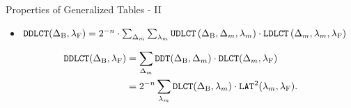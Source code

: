 \begin{frame}{Properties of Generalized \dlct Tables - II}
\begin{itemize}
\item $\texttt{DDLCT}(\Delta_{\textrm{B}}, \lambda_{\textrm{F}}) = 2^{-n}\cdot \sum_{\Delta_{m}}\sum_{\lambda_{m}}  \texttt{UDLCT}\left(\Delta_{\textrm{B}}, \Delta_{m}, \lambda_{m}\right) \cdot \texttt{LDLCT}\left(\Delta_{m}, \lambda_{m}, \lambda_{\textrm{F}}\right)$
\end{itemize}
\begin{align*}
\texttt{DDLCT}(\Delta_{\textrm{B}}, \lambda_{\textrm{F}}) &= \sum_{\Delta_{m}} \texttt{DDT}(\Delta_{\textrm{B}}, \Delta_{m}) \cdot \texttt{DLCT}(\Delta_{m}, \lambda_{\textrm{F}})\\
                        &= 2^{-n}\sum_{\lambda_{m}} \texttt{DLCT}(\Delta_{\textrm{B}}, \lambda_{m})\cdot\texttt{LAT}^{2}(\lambda_{m}, \lambda_{\textrm{F}}).
\end{align*}
\end{frame}

